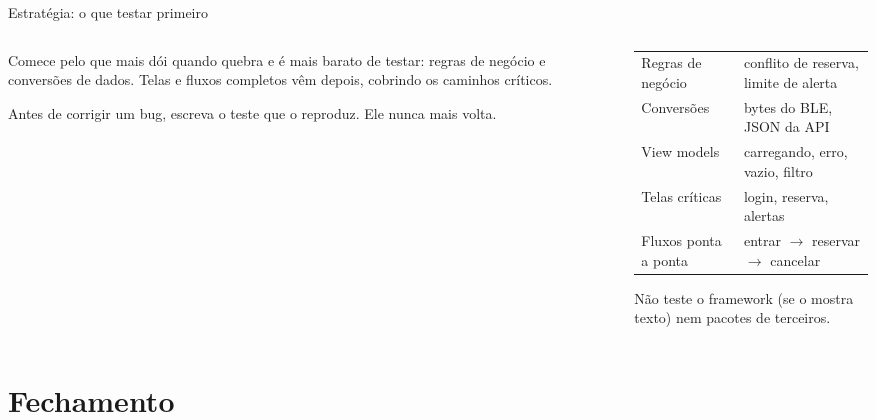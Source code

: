 \documentclass[aspectratio=169,10pt]{beamer}
\begin{document}
\begin{frame}{Estratégia: o que testar primeiro}
  \begin{columns}[T]
    \begin{column}{0.5\textwidth}
      \begin{conceito}
        Comece pelo que mais dói quando quebra e é mais barato de testar: regras de negócio e conversões de dados. Telas e fluxos completos vêm depois, cobrindo os caminhos críticos.
      \end{conceito}
      \begin{dica}[Bug corrigido = teste novo]
        Antes de corrigir um bug, escreva o teste que o reproduz. Ele nunca mais volta.
      \end{dica}
    \end{column}
    \begin{column}{0.48\textwidth}
      \scriptsize
      \begin{tabularx}{\linewidth}{@{}l L@{}}
        \toprule
         &  \\
        \midrule
        Regras de negócio & conflito de reserva, limite de alerta \\
        Conversões & bytes do BLE, JSON da API \\
        View models & carregando, erro, vazio, filtro \\
        Telas críticas & login, reserva, alertas \\
        Fluxos ponta a ponta & entrar $\rightarrow$ reservar $\rightarrow$ cancelar \\
        \bottomrule
      \end{tabularx}
      \begin{atencao}
        Não teste o framework (se o  mostra texto) nem pacotes de terceiros.
      \end{atencao}
    \end{column}
  \end{columns}
\end{frame}

\section{Fechamento}
\end{document}
